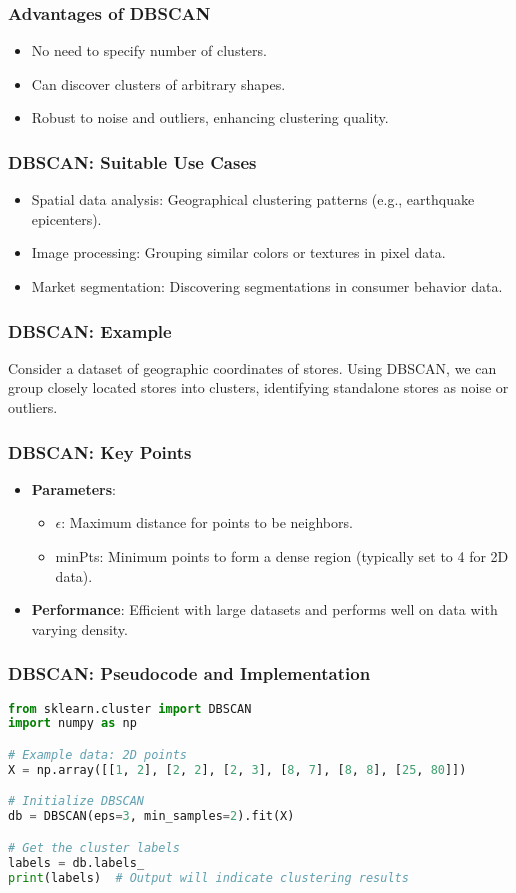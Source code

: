 \documentclass[aspectratio=169]{beamer}
\begin{document}
\begin{frame}
  \frametitle{Advantages of DBSCAN}
  \begin{itemize}
    \item No need to specify number of clusters.
    \item Can discover clusters of arbitrary shapes.
    \item Robust to noise and outliers, enhancing clustering quality.
  \end{itemize}
\end{frame}

\begin{frame}
  \frametitle{DBSCAN: Suitable Use Cases}
  \begin{itemize}
    \item Spatial data analysis: Geographical clustering patterns (e.g., earthquake epicenters).
    \item Image processing: Grouping similar colors or textures in pixel data.
    \item Market segmentation: Discovering segmentations in consumer behavior data.
  \end{itemize}
\end{frame}

\begin{frame}[fragile]
  \frametitle{DBSCAN: Example}
  Consider a dataset of geographic coordinates of stores. Using DBSCAN, we can group closely located stores into clusters, identifying standalone stores as noise or outliers.
\end{frame}

\begin{frame}[fragile]
  \frametitle{DBSCAN: Key Points}
  \begin{itemize}
    \item \textbf{Parameters}: 
      \begin{itemize}
        \item $\epsilon$: Maximum distance for points to be neighbors.
        \item minPts: Minimum points to form a dense region (typically set to 4 for 2D data).
      \end{itemize}
    \item \textbf{Performance}: Efficient with large datasets and performs well on data with varying density.
  \end{itemize}
\end{frame}

\begin{frame}[fragile]
  \frametitle{DBSCAN: Pseudocode and Implementation}
  \begin{lstlisting}[language=Python]
from sklearn.cluster import DBSCAN
import numpy as np

# Example data: 2D points
X = np.array([[1, 2], [2, 2], [2, 3], [8, 7], [8, 8], [25, 80]])

# Initialize DBSCAN
db = DBSCAN(eps=3, min_samples=2).fit(X)

# Get the cluster labels
labels = db.labels_
print(labels)  # Output will indicate clustering results
  \end{lstlisting}
\end{frame}
\end{document}

